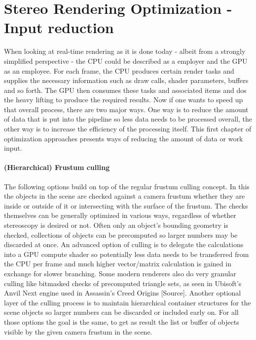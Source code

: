 
\chapter{Stereo Rendering Optimization - Input reduction}
When looking at real-time rendering as it is done today - albeit from a strongly simplified perspective - the CPU could be described as a employer and the GPU as an employee. For each frame, the CPU produces certain render tasks and supplies the necessary information such as draw calls, shader parameters, buffers and so forth. The GPU then consumes these tasks and associated items and dos the heavy lifting to produce the required results. 
Now if one wants to speed up that overall process, there are two major ways. One way is to reduce the amount of data that is put into the pipeline so less data needs to be processed overall, the other way is to increase the efficiency of the processing itself.  
This first chapter of optimization approaches presents ways of reducing the amount of data or work input. 

\subsubsection{(Hierarchical) Frustum culling}
The following options build on top of the regular frustum culling concept. In this the objects in the scene are checked against a camera frustum whether they are inside or outside of it or intersecting with the surface of the frustum. The checks themselves can be generally optimized in various ways, regardless of whether stereoscopy is desired or not. Often only an object's bounding geometry is checked, collections of objects can be precomputed so larger numbers may be discarded at once. An advanced option of culling is to delegate the calculations into a GPU compute shader so potentially less data needs to be transferred from the CPU per frame and much higher vector/matrix calculation is gained in exchange for slower branching. Some modern renderers also do very granular culling like bitmasked checks of precomputed triangle sets, as seen in Ubisoft's Anvil Next engine used in Assassin's Creed Origins [Source]. 
Another optional layer of the culling process is to maintain hierarchical container structures for the scene objects so larger numbers can be discarded or included early on. 
For all those options the goal is the same, to get as result the list or buffer of objects visible by the given camera frustum in the scene. 


